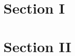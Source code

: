 \documentclass{article}
\begin{document}
  \section{Section I}
  \section{Section II}
\end{document}
